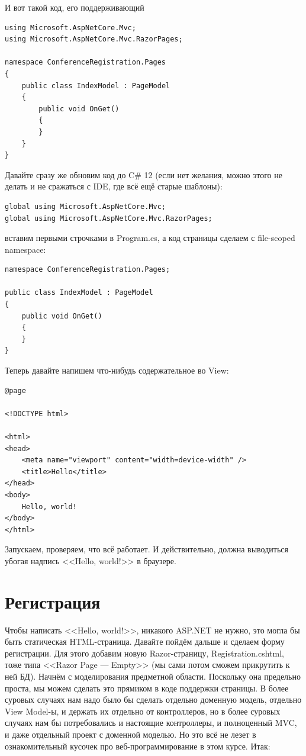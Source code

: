 \documentclass{../../text-style}
\begin{document}
И вот такой код, его поддерживающий

\begin{verbatim}
using Microsoft.AspNetCore.Mvc;
using Microsoft.AspNetCore.Mvc.RazorPages;

namespace ConferenceRegistration.Pages
{
    public class IndexModel : PageModel
    {
        public void OnGet()
        {
        }
    }
}
\end{verbatim}

Давайте сразу же обновим код до C\# 12 (если нет желания, можно этого не делать и не сражаться с IDE, где всё ещё старые шаблоны):

\begin{verbatim}
global using Microsoft.AspNetCore.Mvc;
global using Microsoft.AspNetCore.Mvc.RazorPages;
\end{verbatim}

вставим первыми строчками в Program.cs, а код страницы сделаем с file-scoped namespace:

\begin{verbatim}
namespace ConferenceRegistration.Pages;

public class IndexModel : PageModel
{
    public void OnGet()
    {
    }
}
\end{verbatim}

Теперь давайте напишем что-нибудь содержательное во View:

\begin{verbatim}
@page

<!DOCTYPE html>

<html>
<head>
    <meta name="viewport" content="width=device-width" />
    <title>Hello</title>
</head>
<body>
    Hello, world!
</body>
</html>
\end{verbatim}

Запускаем, проверяем, что всё работает. И действительно, должна выводиться убогая надпись <<Hello, world!>> в браузере.

\section{Регистрация}

Чтобы написать <<Hello, world!>>, никакого ASP.NET не нужно, это могла бы быть статическая HTML-страница. Давайте пойдём дальше и сделаем форму регистрации. Для этого добавим новую Razor-страницу, Registration.cshtml, тоже типа <<Razor Page --- Empty>> (мы сами потом сможем прикрутить к ней БД). Начнём с моделирования предметной области. Поскольку она предельно проста, мы можем сделать это прямиком в коде поддержки страницы. В более суровых случаях нам надо было бы сделать отдельно доменную модель, отдельно View Model-ы, и держать их отдельно от контроллеров, но в более суровых случаях нам бы потребовались и настоящие контроллеры, и полноценный MVC, и даже отдельный проект с доменной моделью. Но это всё не лезет в ознакомительный кусочек про веб-программирование в этом курсе. Итак:
\end{document}
